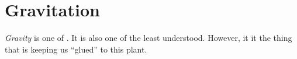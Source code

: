 \section{Gravitation} \label{sec:Gravitation}
\begin{definition}[Gravity] \label{def:Gravity}
  \emph{Gravity} is one of .
  It is also one of the least understood.
  However, it it the thing that is keeping us ``glued'' to this plant.
\end{definition}

